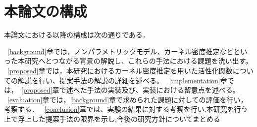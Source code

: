 \section{本論文の構成}

本論文における以降の構成は次の通りである．

~\ref{background}章では，ノンパラメトリックモデル、カーネル密度推定などといった本研究へとつながる背景の解説し、これらの手法における課題を洗い出す。
~\ref{proposed}章では，本研究におけるカーネル密度推定を用いた活性化関数についての解説を行い、提案手法の解説の詳細を述べる。
~\ref{implementation}章では，~\ref{proposed}章で述べた手法の実装及び、実装における留意点を述べる。
~\ref{evaluation}章では，\ref{background}章で求められた課題に対しての評価を行い，考察する．
~\ref{conclusion}章では、実験の結果に対する考察を行い,本研究を行う上で浮上した提案手法の限界を示し,今後の研究方針についてまとめる







